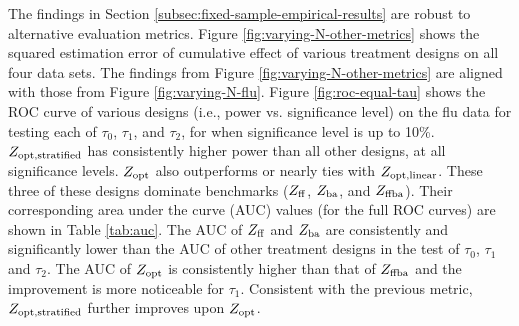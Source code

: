 The findings in Section \ref{subsec:fixed-sample-empirical-results} are robust to alternative evaluation metrics. Figure \ref{fig:varying-N-other-metrics} shows the squared estimation error of cumulative effect of various treatment designs on all four data sets. The findings from Figure \ref{fig:varying-N-other-metrics} are aligned with those from Figure \ref{fig:varying-N-flu}.
Figure \ref{fig:roc-equal-tau} shows the ROC curve of various designs (i.e., power vs. significance level) on the flu data for testing each of $\tau_0$, $\tau_1$, and $\tau_2$, for when significance level is up to 10\%. $Z_{\textnormal{opt},\mathrm{stratified}}$ has consistently higher power than all other designs, at all significance levels. $Z_{\textnormal{opt}}$ also outperforms or nearly ties with $Z_{\textnormal{opt},\mathrm{linear}}$. These three of these designs dominate benchmarks ($Z_{\mathrm{ff}}$, $Z_{\mathrm{ba}}$, and $Z_{\mathrm{ffba}}$). 
Their corresponding area under the curve (AUC) values (for the full ROC curves) are shown in 
Table \ref{tab:auc}. The AUC of $Z_{\mathrm{ff}}$ and $Z_{\mathrm{ba}}$ are consistently and significantly lower than the AUC of other treatment designs in the test of $\tau_0$, $\tau_1$ and $\tau_2$. The AUC of $Z_{\textnormal{opt}}$ is consistently higher than that of $Z_{\mathrm{ffba}}$ and the improvement is more noticeable for $\tau_1$. Consistent with the previous metric, $Z_{\textnormal{opt},\mathrm{stratified}}$ further improves upon $Z_{\textnormal{opt}}$. 
